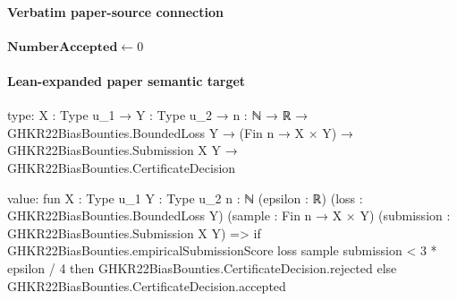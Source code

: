 \documentclass[10pt]{article}
\begin{document}
\paragraph{Verbatim paper-source connection}
\begin{ReviewVerbatim}
\begin{algorithm}
\ifdraft
\else
\small
\fi
{}
$\mathbf{NumberAccepted} \leftarrow 0$

\caption{CertificateChecker($\epsilon,D,U,(f_1,g_1,h_1),\ldots )$: An algorithm that takes as input a stream of submissions $(f_i,g_i,h_i)$ and checks if $(g_i,h_i)$ is a certificate of sub-optimality for $f_i$ with sufficiently high parameter values.}
\label{alg:checker}
\end{algorithm}
\end{ReviewVerbatim}



\paragraph{Lean-expanded paper semantic target}
\begin{ReviewVerbatim}
type:
{X : Type u_1} →
  {Y : Type u_2} →
    {n : ℕ} →
      ℝ →
        GHKR22BiasBounties.BoundedLoss Y →
          (Fin n → X × Y) → GHKR22BiasBounties.Submission X Y → GHKR22BiasBounties.CertificateDecision

value:
fun {X : Type u_1} {Y : Type u_2} {n : ℕ} (epsilon : ℝ) (loss : GHKR22BiasBounties.BoundedLoss Y)
    (sample : Fin n → X × Y) (submission : GHKR22BiasBounties.Submission X Y) =>
  if GHKR22BiasBounties.empiricalSubmissionScore loss sample submission < 3 * epsilon / 4 then
    GHKR22BiasBounties.CertificateDecision.rejected
  else GHKR22BiasBounties.CertificateDecision.accepted
\end{ReviewVerbatim}
\end{document}
